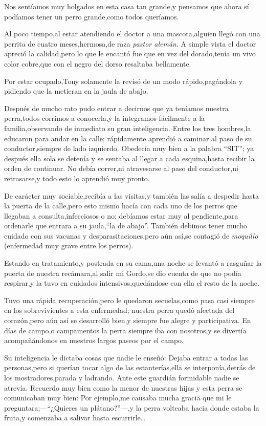 \documentclass[letterpaper,12pt]{book}
\begin{document}
Nos sentíamos muy holgados en esta casa tan grande,y pensamos  que ahora sí podíamos tener un perro grande,como todos queríamos.

Al poco tiempo,al estar atendiendo el doctor a una mascota,alguien llegó con una perrita de cuatro meses,hermosa,de raza \textit{pastor alemán}. A simple vista el doctor apreció la calidad,pero lo que le encantó fue que en vez del dorado,tenía un vivo color cobre,que con el negro del dorso resaltaba bellamente.

Por estar ocupado,Tony solamente la revisó de un modo rápido,pagándola y pidiendo que la metieran en la jaula de abajo.

Después de mucho rato pudo entrar a decirnos que ya teníamos nuestra perra,todos corrimos a conocerla,y la integramos fácilmente a la familia,observando de inmediato su gran inteligencia. Entre los tres hombres,la educaron para andar en la calle; rápidamente aprendió a caminar al paso de su conductor,siempre de lado izquierdo. Obedecía muy bien a la palabra ``SIT''; ya después ella sola se detenía y se sentaba al llegar a cada esquina,hasta recibir la orden de continuar. No debía correr,ni atravesarse al paso del conductor,ni retrasarse,y todo esto lo aprendió muy pronto. 

De carácter muy sociable,recibía a las visitas,y también las salía a despedir hasta la puerta de la calle,pero esto mismo hacía con cada uno de los perros que llegaban a consulta,infecciosos o no; debíamos estar muy al pendiente,para ordenarle que entrara a su jaula,``la de abajo''. También debimos tener mucho cuidado con sus vacunas y desparasitaciones,pero aún así,se contagió de \textit{moquillo} (enfermedad muy grave entre los perros).

Estando en tratamiento,y postrada en su cama,una noche se levantó a rasguñar la puerta de nuestra recámara,al salir mi Gordo,se dio cuenta de que no podía respirar,y  la tuvo en cuidados intensivos,quedándose con ella el resto de la noche.

Tuvo una rápida recuperación,pero le quedaron secuelas,como pasa casi siempre en los sobrevivientes a esta enfermedad; nuestra perra quedó afectada del corazón,pero aún así se desarrolló bien,y siempre fue alegre y participativa. En días de campo,o campamentos la perra siempre iba con nosotros,y se divertía acompañándonos en nuestros largos paseos por el campo.

Su inteligencia le dictaba cosas que nadie le enseñó: Dejaba entrar a todas las personas,pero si querían tocar algo de las estanterías,ella se interponía,detrás de los mostradores,parada y ladrando. Ante este guardián formidable nadie se atrevía.
Recuerdo muy bien como la menor de nuestras hijas y esta perra se comunicaban muy bien: Por ejemplo,me causaba mucha gracia que mi le preguntara;---``¿Quieres un plátano?''---,y la perra volteaba hacia donde estaba la fruta,y comenzaba a salivar hasta escurrirle\ldots
\end{document}
